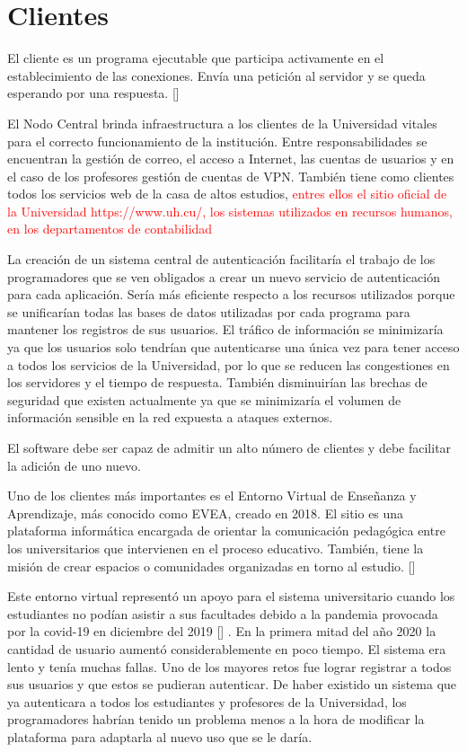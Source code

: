 \section*{Clientes}
El cliente es un programa ejecutable que participa activamente en el establecimiento de las conexiones. Envía una petición al servidor y se queda esperando por una respuesta. [\cite{lizama2016redes}]

El Nodo Central brinda infraestructura a los clientes de la Universidad vitales para el correcto funcionamiento de la institución. Entre responsabilidades se encuentran la gestión de correo, el acceso a Internet, las cuentas de usuarios y en el caso de los profesores gestión de cuentas de VPN. También tiene como clientes todos los servicios web de la casa de altos estudios, \textcolor{red}{entres ellos el sitio oficial de la Universidad https://www.uh.cu/, los sistemas utilizados en recursos humanos, en los departamentos de contabilidad}

La creación de un sistema central de autenticación facilitaría el trabajo de los programadores que se ven obligados a crear un nuevo servicio de autenticación para cada aplicación. Sería más eficiente respecto a los recursos utilizados porque se unificarían todas las bases de datos utilizadas por cada programa para mantener los registros de sus usuarios. El tráfico de información se minimizaría ya que los usuarios solo tendrían que autenticarse una única vez para tener acceso a todos los servicios de la Universidad, por lo que se reducen las congestiones en los servidores y el tiempo de respuesta. También disminuirían las brechas de seguridad que existen actualmente ya que se minimizaría el volumen de información sensible en la red expuesta a ataques externos.

El software debe ser capaz de admitir un alto número de clientes y debe facilitar la adición de uno nuevo.

Uno de los clientes más importantes es el Entorno Virtual de Enseñanza y Aprendizaje, más conocido como EVEA, creado en 2018. El sitio es una plataforma informática encargada de orientar la comunicación pedagógica entre los universitarios que intervienen en el proceso educativo. También, tiene la misión de crear espacios o comunidades organizadas en torno al estudio. [\cite{evea-cd}] 

Este entorno virtual representó un apoyo para el sistema universitario cuando los estudiantes no podían asistir a sus facultades debido a la pandemia provocada por la covid-19 en diciembre del 2019 [\cite{ferrer2020pandemia}] . En la primera mitad del año 2020 la cantidad de usuario aumentó considerablemente en poco tiempo. El sistema era lento y tenía muchas fallas. Uno de los mayores retos fue lograr registrar a todos sus usuarios y que estos se pudieran autenticar. De haber existido un sistema que ya autenticara a todos los estudiantes y profesores de la Universidad, los programadores habrían tenido un problema menos a la hora de modificar la plataforma para adaptarla al nuevo uso que se le daría.



